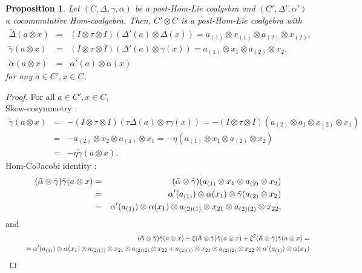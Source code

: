 \documentclass{article}
\newtheorem{prop}[thm]{Proposition}
\theoremstyle{definition}
\theoremstyle{remark}
\numberwithin{equation}{section}
\begin{document}
\begin{prop}
 Let $(C, \Delta, \gamma,\alpha)$ be a post-Hom-Lie coalgebra and $(C', \Delta',\alpha')$ a cocommutative Hom-coalgebra. Then, $C'\otimes C$ is a post-Hom-Lie
coalgebra with
\begin{eqnarray}
 \tilde\Delta(a\otimes x)&=&(I\otimes \tau\otimes I)(\Delta'(a)\otimes\Delta(x))=a_{(1)}\otimes x_{(1)}\otimes a_{(2)}\otimes x_{(2)},\nonumber\\
\tilde\gamma(a\otimes x)&=&(I\otimes \tau\otimes I)(\Delta'(a)\otimes\gamma(x))=a_{(1)}\otimes x_{1}\otimes a_{(2)}\otimes x_{2},\nonumber\\
\tilde\alpha(a\otimes  x)&=&\alpha'(a)\otimes\alpha(x) \nonumber
\end{eqnarray}
for any $a\in C', x\in C$.
\end{prop}
\begin{proof} For all $a\in C', x\in C$,\\
Skew-cosymmetry :
\begin{eqnarray}
 \tilde\gamma(a\otimes x)
&=&-(I\otimes\tau\otimes I)(\tau\Delta(a)\otimes\tau\gamma(x))=-(I\otimes\tau\otimes I)(a_{(2)}\otimes a_{1}\otimes x_{(2)}\otimes x_{1})\nonumber\\
&=&-a_{(2)}\otimes x_{2}\otimes a_{(1)}\otimes x_{1}=-\eta(a_{(1)}\otimes x_{1}\otimes a_{(2)}\otimes x_{2})\nonumber\\
&=&-\eta\tilde\gamma(a\otimes x)\nonumber.
\end{eqnarray}
Hom-CoJacobi identity :
\begin{eqnarray}
 ({\bf \tilde\alpha}\otimes\tilde\gamma)\tilde\gamma(a\otimes x)&=&({\bf \tilde\alpha}\otimes\tilde\gamma)(a_{(1)}\otimes x_{1}\otimes a_{(2)}\otimes x_{2})\nonumber\\
&=&\alpha'(a_{(1)})\otimes \alpha(x_{1})\otimes\tilde\gamma(a_{(2)}\otimes x_{2})\nonumber\\
&=&\alpha'(a_{(1)})\otimes \alpha(x_{1})\otimes a_{(2)(1)}\otimes x_{21}\otimes a_{(2)(2)}\otimes x_{22},\nonumber
\end{eqnarray}
and
\begin{eqnarray}
 &&({\bf \tilde\alpha}\otimes\tilde\gamma)\tilde\gamma(a\otimes x)+\xi({\bf \tilde\alpha}\otimes\tilde\gamma)\tilde\gamma(a\otimes x)
+\xi^2({\bf \tilde\alpha}\otimes\tilde\gamma)\tilde\gamma(a\otimes x)=\nonumber\\
&&\qquad=\alpha'(a_{(1)})\otimes\alpha(x_{1})\otimes a_{(2)(1)}\otimes x_{21}\otimes a_{(2)(2)}\otimes x_{22}
+a_{(2)(1)}\otimes x_{21}\otimes a_{(2)(2)}\otimes x_{22}\otimes \alpha'(a_{(1)})\otimes \alpha(x_{1})\nonumber\\

\end{eqnarray}
\end{proof}
\end{document}
